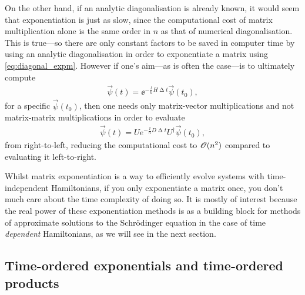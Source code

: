 On the other hand, if an analytic diagonalisation is already known, it would seem that exponentiation is just as slow, since the computational cost of matrix multiplication alone is the same order in $n$ as that of numerical diagonalisation. This is true---so there are only constant factors to be saved in computer time by using an analytic diagonalisation in order to exponentiate a matrix using \eqref{eq:diagonal_expm}. However if one's aim---as is often the case---is to ultimately compute
\begin{align}
\vec\psi(t) = \ee^{-\frac \ii \hbar H \upDelta t}\vec\psi(t_0),
\end{align}
for a specific $\vec \psi(t_0)$, then one needs only matrix-vector multiplications and not matrix-matrix multiplications in order to evaluate
\begin{align}
\vec\psi(t) = U e^{-\frac \ii \hbar D \upDelta t} U^\dagger \vec\psi(t_0),
\end{align}
from right-to-left, reducing the computational cost to $\mathscr{O}(n^2)$ compared to evaluating it left-to-right.

Whilst matrix exponentiation is a way to efficiently evolve systems with time-independent Hamiltonians, if you only exponentiate a matrix once, you don't much care about the time complexity of doing so. It is mostly of interest because the real power of these exponentiation methods is as a building block for methods of approximate solutions to the Schr\"odinger equation in the case of time \emph{dependent} Hamiltonians, as we will see in the next section.

\subsection{Time-ordered exponentials and time-ordered products}

